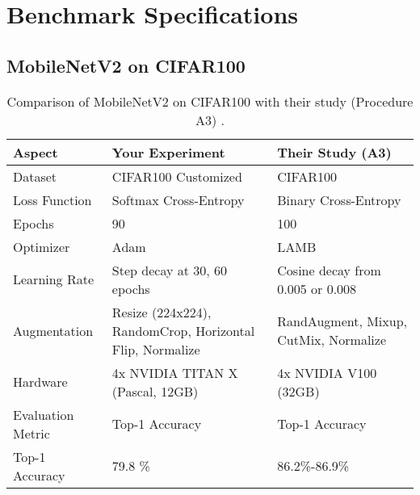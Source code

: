 \chapter{Benchmark Specifications} 
\label{app:B}
\section{MobileNetV2 on CIFAR100}

\begin{table}[H]
    \centering
    \caption{Comparison of MobileNetV2 on CIFAR100 with their study (Procedure A3) \cite{wightman2021resnetstrikesbackimproved}.}
    \begin{tabular}{lp{5cm}p{5cm}}
        \toprule
        \textbf{Aspect} & \textbf{Your Experiment} & \textbf{Their Study (A3)} \\ 
        \midrule
        Dataset            & CIFAR100 Customized                & CIFAR100                \\
        Loss Function      & Softmax Cross-Entropy   & Binary Cross-Entropy    \\
        Epochs             & 90                      & 100                     \\
        Optimizer          & Adam                    & LAMB                    \\
        Learning Rate      & Step decay at 30, 60 epochs & Cosine decay from 0.005 or 0.008 \\
        Augmentation       & Resize (224x224), RandomCrop, Horizontal Flip, Normalize & RandAugment, Mixup, CutMix, Normalize \\
        Hardware           & 4x NVIDIA TITAN X (Pascal, 12GB) & 4x NVIDIA V100 (32GB) \\
        Evaluation Metric  & Top-1 Accuracy          & Top-1 Accuracy          \\
        Top-1 Accuracy     & 79.8 \% & 86.2\%-86.9\%           \\
        \bottomrule
    \end{tabular}
    \label{tab:comparison_mobilenet}
\end{table}
